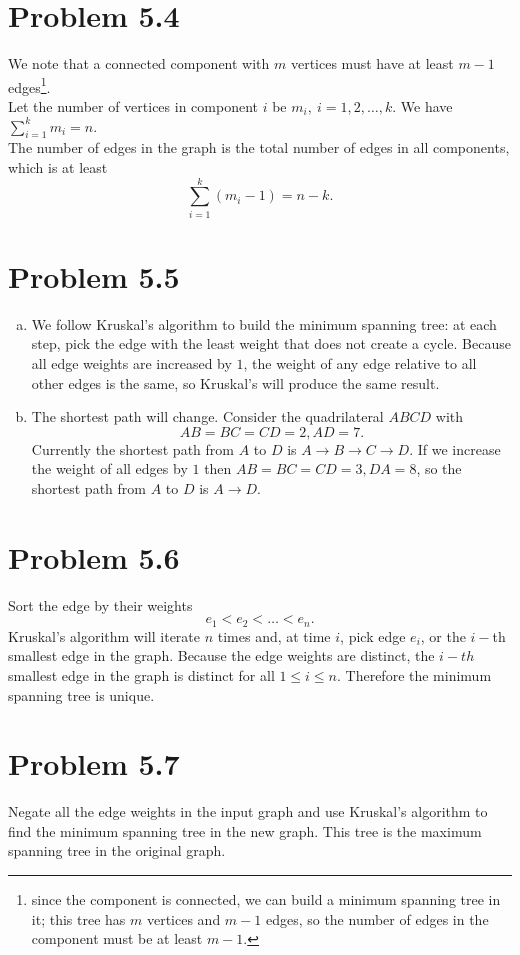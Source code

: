 \documentclass[12pt]{report}
\begin{document}
\section{Problem 5.4}
We note that a connected component with $m$ vertices must have at least $m - 1$ edges\footnote{since the component is connected, we can build a minimum spanning tree in it; this tree has $m$ vertices and $m-1$ edges, so the number of edges in the component must be at least $m-1$.}. \\
Let the number of vertices in component $i$ be $m_i, \ i = 1,2,\ldots,k$. We have $\displaystyle \sum_{i=1}^k m_i = n$.\\
The number of edges in the graph is the total number of edges in all components, which is at least $$\sum_{i=1}^k (m_i - 1) = n - k.$$


\section{Problem 5.5}
\begin{enumerate}[(a)]
  \item We follow Kruskal's algorithm to build the minimum spanning tree: at each step, pick the edge with the least weight that does not create a cycle. Because all edge weights are increased by $1$, the weight of any edge relative to all other edges is the same, so Kruskal's will produce the same result.
  \item The shortest path will change. Consider the quadrilateral $ABCD$ with $$AB = BC = CD = 2, AD = 7.$$ Currently the shortest path from $A$ to $D$ is $A \to B \to C \to D$. If we increase the weight of all edges by $1$ then $AB = BC = CD = 3, DA = 8$, so the shortest path from $A$ to $D$ is $A \to D$.
\end{enumerate}

\section{Problem 5.6}
Sort the edge by their weights $$e_1 < e_2 < \ldots < e_n.$$
Kruskal's algorithm will iterate $n$ times and, at time $i$, pick edge $e_i$, or the $i-$th smallest edge in the graph. Because the edge weights are distinct, the $i-th$ smallest edge in the graph is distinct for all $1 \le i \le n$. Therefore the minimum spanning tree is unique.

\section{Problem 5.7}
Negate all the edge weights in the input graph and use Kruskal's algorithm to find the minimum spanning tree in the new graph. This tree is the maximum spanning tree in the original graph.
\end{document}
